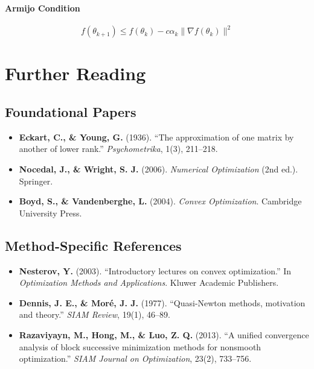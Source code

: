 \documentclass[11pt,oneside]{article}
\newcommand{\grad}{\nabla}
\begin{document}
\paragraph{Armijo Condition}
\begin{equation*}
    f(\theta_{k+1}) \leq f(\theta_k) - c\alpha_k \|\grad f(\theta_k)\|^2
\end{equation*}

\newpage

\section{Further Reading}\label{app:reading}

\subsection*{Foundational Papers}

\begin{itemize}
    \item \textbf{Eckart, C., \& Young, G.} (1936). ``The approximation of one matrix by another of lower rank.'' \textit{Psychometrika}, 1(3), 211--218.
    
    \item \textbf{Nocedal, J., \& Wright, S. J.} (2006). \textit{Numerical Optimization} (2nd ed.). Springer.
    
    \item \textbf{Boyd, S., \& Vandenberghe, L.} (2004). \textit{Convex Optimization}. Cambridge University Press.
\end{itemize}

\subsection*{Method-Specific References}

\begin{itemize}
    \item \textbf{Nesterov, Y.} (2003). ``Introductory lectures on convex optimization.'' In \textit{Optimization Methods and Applications}. Kluwer Academic Publishers.
    
    \item \textbf{Dennis, J. E., \& Moré, J. J.} (1977). ``Quasi-Newton methods, motivation and theory.'' \textit{SIAM Review}, 19(1), 46--89.
    
    \item \textbf{Razaviyayn, M., Hong, M., \& Luo, Z. Q.} (2013). ``A unified convergence analysis of block successive minimization methods for nonsmooth optimization.'' \textit{SIAM Journal on Optimization}, 23(2), 733--756.
\end{itemize}
\end{document}
